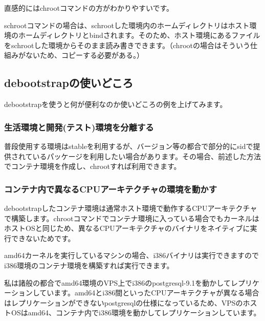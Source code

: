 \documentclass[mingoth,a4paper]{jsarticle}
\begin{document}
直感的にはchrootコマンドの方がわかりやすいです。

schrootコマンドの場合は、schrootした環境内のホームディレクトリはホスト環境のホームディレクトリとbindされます。そのため、ホスト環境にあるファイルをschrootした環境からそのまま読み書きできます。（chrootの場合はそういう仕組みがないため、コピーする必要がある。）

\subsection{debootstrapの使いどころ}

debootstrapを使うと何が便利なのか使いどころの例を上げてみます。

\subsubsection{生活環境と開発(テスト)環境を分離する}

普段使用する環境はstableを利用するが、バージョン等の都合で部分的にsidで提供されているパッケージを利用したい場合があります。その場合、前述した方法でコンテナ環境を作成し、chrootすれば利用できます。

\subsubsection{コンテナ内で異なるCPUアーキテクチャの環境を動かす}

debootstrapしたコンテナ環境は通常ホスト環境で動作するCPUアーキテクチャで構築します。chrootコマンドでコンテナ環境に入っている場合でもカーネルはホストOSと同じため、異なるCPUアーキテクチャのバイナリをネイティブに実行できないためです。

amd64カーネルを実行しているマシンの場合、i386バイナリは実行できますのでi386環境のコンテナ環境を構築すれば実行できます。

私は諸般の都合でamd64環境のVPS上でi386のpostgresql-9.1を動かしてレプリケーションしています。amd64とi386間といったCPUアーキテクチャが異なる場合はレプリケーションができないpostgresqlの仕様になっているため、VPSのホストOSはamd64、コンテナ内でi386環境を動かしてレプリケーションしています。

\end{document}
